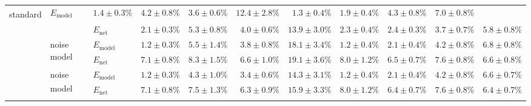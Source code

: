 \begin{sidewaystable}
\begin{tabular}{p{2.2cm} p{1.7cm} l r r r r r r r r }
{	standard\textsuperscript{\dag}} &
	$E_\mathrm{model}$ & 
	\color{Gray}$1.4 \pm 0.3\%$ & \color{Gray}$4.2 \pm 0.8\%$ & \color{Gray}$3.6 \pm 0.6\%$ & \color{Gray}$12.4 \pm 2.8\%$ & \color{Gray}$1.3 \pm 0.4\%$ & \color{Gray}$1.9 \pm 0.4\%$ & \color{Gray}$4.3 \pm 0.8\%$ & \color{Gray}$7.0 \pm 0.8\%$
	\\
	& & 
	$E_\mathrm{net}$ &
	\cellcolor{White!100!SteelBlue}$\mathbf{2.1 \pm 0.3\%}$ & \cellcolor{White!100!SteelBlue}$\mathbf{5.3 \pm 0.8\%}$ & \cellcolor{White!100!SteelBlue}$\mathbf{4.0 \pm 0.6\%}$ & \cellcolor{White!88!SteelBlue}$13.9 \pm 3.0\%$ & \cellcolor{White!100!SteelBlue}$\mathbf{2.3 \pm 0.4\%}$ & \cellcolor{White!100!SteelBlue}$\mathbf{2.4 \pm 0.3\%}$ & \cellcolor{White!100!SteelBlue}$\mathbf{3.7 \pm 0.7\%}$ & \cellcolor{White!100!SteelBlue}$\mathbf{5.8 \pm 0.8\%}$
	\\\cmidrule(l){2-11}
	&
	\multirow{2}{1.7cm}{\raggedleft %
	noise model} &
	$E_\mathrm{model}$ & 
	\color{Gray}$1.2 \pm 0.3\%$ & \color{Gray}$5.5 \pm 1.4\%$ & \color{Gray}$3.8 \pm 0.8\%$ & \color{Gray}$18.1 \pm 3.4\%$ & \color{Gray}$1.2 \pm 0.4\%$ & \color{Gray}$2.1 \pm 0.4\%$ & \color{Gray}$4.2 \pm 0.8\%$ & \color{Gray}$6.8 \pm 0.8\%$
	\\
	& & 
	$E_\mathrm{net}$ &
	\cellcolor{White!38!SteelBlue}$7.1 \pm 0.8\%$ & \cellcolor{White!57!SteelBlue}$8.3 \pm 1.5\%$ & \cellcolor{White!57!SteelBlue}$6.6 \pm 1.0\%$ & \cellcolor{White!57!SteelBlue}$19.1 \pm 3.6\%$ & \cellcolor{White!38!SteelBlue}$8.0 \pm 1.2\%$ & \cellcolor{White!57!SteelBlue}$6.5 \pm 0.7\%$ & \cellcolor{White!57!SteelBlue}$7.6 \pm 0.8\%$ & \cellcolor{White!69!SteelBlue}$6.6 \pm 0.8\%$
	\\\cmidrule(l){2-11}
	&
	\multirow{2}{1.7cm}{\raggedleft %
	noise model\textsuperscript{\dag}} &
	$E_\mathrm{model}$ & 
	\color{Gray}$\mathbf{1.2 \pm 0.3\%}$ & \color{Gray}$4.3 \pm 1.0\%$ & \color{Gray}$3.4 \pm 0.6\%$ & \color{Gray}$14.3 \pm 3.1\%$ & \color{Gray}$1.2 \pm 0.4\%$ & \color{Gray}$2.1 \pm 0.4\%$ & \color{Gray}$\mathbf{4.2 \pm 0.8\%}$ & \color{Gray}$6.6 \pm 0.7\%$
	\\
	& & 
	$E_\mathrm{net}$ &
	\cellcolor{White!32!SteelBlue}$7.1 \pm 0.8\%$ & \cellcolor{White!82!SteelBlue}$7.5 \pm 1.3\%$ & \cellcolor{White!75!SteelBlue}$6.3 \pm 0.9\%$ & \cellcolor{White!82!SteelBlue}$15.9 \pm 3.3\%$ & \cellcolor{White!32!SteelBlue}$8.0 \pm 1.2\%$ & \cellcolor{White!63!SteelBlue}$6.4 \pm 0.7\%$ & \cellcolor{White!63!SteelBlue}$7.6 \pm 0.8\%$ & \cellcolor{White!75!SteelBlue}$6.4 \pm 0.7\%$
	\\\midrule
	\multirow{8}{2.2cm}{\raggedleft %
}
\end{tabular}
\end{sidewaystable}
